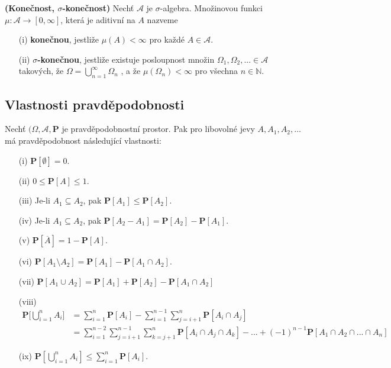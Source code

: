 \begin{definition}\textbf{(Konečnost, $\sigma$-konečnost)}
Nechť $\mathcal{A}$ je $\sigma$-algebra. Množinovou funkci $\mu: \mathcal{A} \longrightarrow [0,\infty]$, která je aditivní na $A$ nazveme
\begin{itemize}
\item[(i)] \textbf{konečnou}, jestliže $\mu(A)<\infty$ pro každé $A \in \mathcal{A}$.
\item[(ii)]\textbf{$\sigma$-konečnou}, jestliže existuje posloupnost množin $\Omega_{1},\Omega_{2}, ... \in \mathcal{A}$ takových, že $\Omega = \bigcup_{n=1}^{\infty}\Omega_{n}$ , a  že $\mu(\Omega_{n})<\infty$ pro všechna $n \in \mathbb{N}$.
\end{itemize}
\end{definition}

\subsection{Vlastnosti pravděpodobnosti}\label{SubsVlastnostiPsti}
\begin{theorem} Nechť $(\Omega, \mathcal{A},\textbf{P}$ je pravděpodobnostní prostor. Pak pro libovolné jevy $A,A_1,A_2,\ldots$ má pravděpodobnost následující vlastnosti:
\begin{itemize}
\item[(i)] $\textbf{P}[\emptyset] = 0$.
\item[(ii)] $0 \leq \textbf{P}[A] \leq 1$.
\item[(iii)] Je-li $A_{1} \subseteq A_{2}$, pak $\textbf{P}[A_{1}] \leq \textbf{P}[A_{2}]$.
\item[(iv)] Je-li $A_{1} \subseteq A_{2}$, pak $\textbf{P}[A_{2} - A_{1}] = \textbf{P}[A_{2}] - \textbf{P}[A_{1}]$.
\item[(v)] $\textbf{P}[\overline{A}] = 1 - \textbf{P}[A]$.
\item[(vi)] $\textbf{P}[A_{1} \setminus A_{2}] = \textbf{P}[A_{1}] - \textbf{P}[A_{1} \cap A_{2}].$
\item[(vii)] $\textbf{P}[A_{1} \cup A_{2}] = \textbf{P}[A_{1}] + \textbf{P}[A_{2}] - \textbf{P}[A_{1} \cap A_{2}]$
\item[(viii)] 
\begin{align*}
\textbf{P}\bigg[ \bigcup_{i = 1}^{n} A_{i} \bigg] &= \sum_{i=1}^{n}\textbf{P}[A_{i}] - \sum_{i=1}^{n-1}\sum_{j=i+1}^{n}\textbf{P}[A_{i} \cap A_{j}] \\
&= \sum_{i=1}^{n-2}\sum_{j=i+1}^{n-1}\sum_{k=j+1}^{n}\textbf{P}[A_{i} \cap A_{j} \cap A_{k}]- ... + (-1)^{n-1}\textbf{P}[A_{1} \cap A_{2} \cap ... \cap A_{n}]
\end{align*}
\item[(ix)] $\textbf{P}[\bigcup_{i=1}^{n} A_{i}] \leq \sum_{i=1}^{n} \textbf{P}[A_{i}].$
\end{itemize}
\end{theorem}

